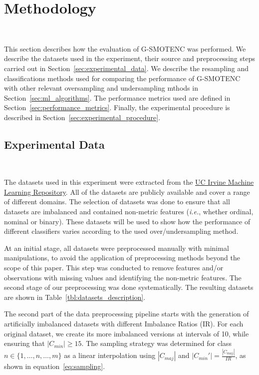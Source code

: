 \documentclass[parskip=full]{scrartcl}
\begin{document}
\section{Methodology}~\label{sec:methodology}

This section describes how the evaluation of G-SMOTENC was performed.  We
describe the datasets used in the experiment, their source and preprocessing
steps carried out in Section~\ref{sec:experimental_data}. We describe the
resampling and classifications methods used for comparing the performance of
G-SMOTENC with other relevant oversampling and undersampling mthods in
Section~\ref{sec:ml_algorithms}. The performance metrics used are defined in
Section~\ref{sec:performance_metrics}. Finally, the experimental procedure is
described in Section~\ref{sec:experimental_procedure}.

\subsection{Experimental Data}~\label{sec:experimental_data}

The datasets used in this experiment were extracted from the
\href{https://archive.ics.uci.edu}{UC Irvine Machine Learning Repository}. All
of the datasets are publicly available and cover a range of different domains.
The selection of datasets was done to ensure that all datasets are imbalanced
and contained non-metric features (\textit{i.e.}, whether ordinal, nominal or
binary). These datasets will be used to show how the performance of different
classifiers varies according to the used over/undersampling method.

At an initial stage, all datasets were preprocessed manually with minimal
manipulations, to avoid the application of preprocessing methods beyond the
scope of this paper. This step was conducted to remove features and/or
observations with missing values and identifying the non-metric features. The
second stage of our preprocessing was done systematically. The resulting
datasets are shown in Table~\ref{tbl:datasets_description}.



The second part of the data preprocessing pipeline starts with the generation
of artificially imbalanced datasets with different Imbalance Ratios (IR). For
each original dataset, we create its more imbalanced versions at intervals of
10, while ensuring that $|C_{min}| \ge 15$. The sampling strategy was
determined for class $n \in \{1,\ldots,n,\ldots,m\}$ as a linear interpolation using $|C_{maj}|$ and
$|C_{min}'|=\frac{|C_{maj}|}{IR}$, as shown in equation~\ref{eq:sampling}.
\end{document}
